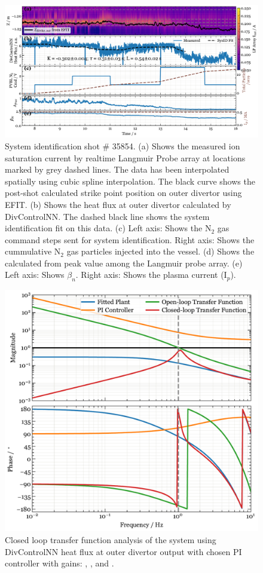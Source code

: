 \begin{figure}[!ht]
 \centering
 \includegraphics[width=\textwidth]{figures/DetCtrl_2D_35854.pdf}
 \caption{System identification shot \# 35854. (a) Shows the measured ion saturation current by realtime Langmuir Probe array at locations marked by grey dashed lines. The data has been interpolated spatially using cubic spline interpolation. The black curve shows the post-shot calculated strike point position on outer divertor using EFIT. (b) Shows the heat flux at outer divertor calculated by DivControlNN. The dashed black line shows the system identification fit on this data. (c) Left axis: Shows the N$_2$ gas command steps sent for system identification. Right axis: Shows the cummulative N$_2$ gas particles injected into the vessel. 
 (d) Shows the \Afrac calculated from peak value among the Langmuir probe array. (e) Left axis: Shows $\beta_n$. Right axis: Shows the plasma current (I$_p$).}
 \label{fig:sysid_sm}
\end{figure}

\begin{figure}[!ht]
 \centering
 \includegraphics[width=\linewidth]{figures/SM_LoopStability.pdf}
 \caption{Closed loop transfer function analysis of the system using DivControlNN heat flux at outer divertor output with chosen PI controller with gains: \SMKp, \SMTi, and \SMstau.}
 \label{fig:cltf_sm}
\end{figure}

